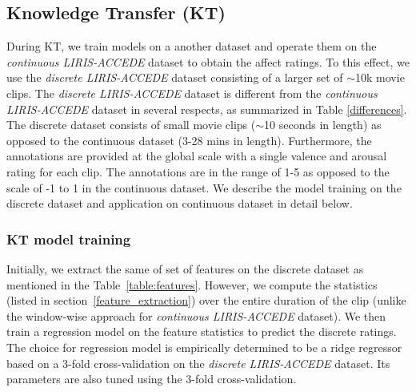 \documentclass{article}
\begin{document}
\begin{spacing}{0.9}
\vspace{-2mm}
\subsection{Knowledge Transfer (KT)}
\vspace{-2mm}
During KT, we train models on a another dataset and operate them on the {\it continuous LIRIS-ACCEDE} dataset to obtain the affect ratings.
To this effect, we use the {\it discrete LIRIS-ACCEDE} dataset consisting of a larger set of $\sim$10k movie clips.  
The {\it discrete LIRIS-ACCEDE} dataset is different from the {\it continuous LIRIS-ACCEDE} dataset in several respects, as summarized in Table \ref{differences}.
The discrete dataset consists of small movie clips ($\sim$10 seconds in length) as opposed to the continuous dataset (3-28 mins in length).
Furthermore, the annotations are provided at the global scale with a single valence and arousal rating for each clip.
The annotations are in the range of 1-5 as opposed to the scale of -1 to 1 in the continuous dataset. 
We describe the model training on the discrete dataset and application on continuous dataset in detail below.

\vspace{-2mm}
\subsubsection{KT model training}
\vspace{-2mm}
Initially, we extract the same of set of features on the discrete dataset as mentioned in the Table~\ref{table:features}.
However, we compute the statistics (listed in section~\ref{feature_extraction}) over the entire duration of the clip (unlike the window-wise approach for {\it continuous LIRIS-ACCEDE} dataset).
We then train a regression model on the feature statistics to predict the discrete ratings.
The choice for regression model is empirically determined to be a ridge regressor based on a 3-fold cross-validation on the {\it discrete LIRIS-ACCEDE} dataset. Its parameters are also tuned using the 3-fold cross-validation. 


\vspace{-2mm}

\end{spacing}
\end{document}
